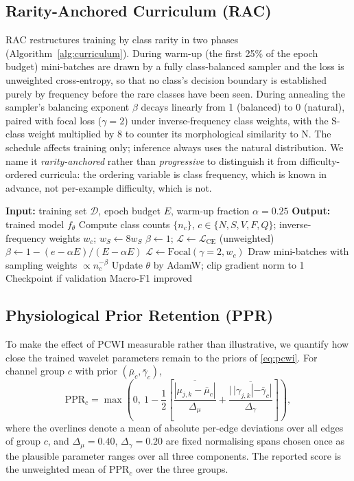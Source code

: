 \documentclass[journal,twoside,web]{ieeecolor}
\begin{document}
\subsection{Rarity-Anchored Curriculum (RAC)}
\label{sec:rac}
RAC restructures training by class rarity in two phases (Algorithm~\ref{alg:curriculum}). During warm-up (the first 25\% of the epoch budget) mini-batches are drawn by a fully class-balanced sampler and the loss is unweighted cross-entropy, so that no class's decision boundary is established purely by frequency before the rare classes have been seen. During annealing the sampler's balancing exponent $\beta$ decays linearly from 1 (balanced) to 0 (natural), paired with focal loss ($\gamma=2$) under inverse-frequency class weights, with the S-class weight multiplied by 8 to counter its morphological similarity to N. The schedule affects training only; inference always uses the natural distribution. We name it \emph{rarity-anchored} rather than \emph{progressive} to distinguish it from difficulty-ordered curricula: the ordering variable is class frequency, which is known in advance, not per-example difficulty, which is not.

\begin{algorithm}[!t]
\caption{Rarity-Anchored Curriculum (RAC)}
\label{alg:curriculum}
\begin{algorithmic}[1]
\STATE \textbf{Input:} training set $\mathcal{D}$, epoch budget $E$, warm-up fraction $\alpha=0.25$
\STATE \textbf{Output:} trained model $f_\theta$
\STATE Compute class counts $\{n_c\}$, $c\in\{N,S,V,F,Q\}$; inverse-frequency weights $w_c$; $w_S \gets 8 w_S$
\STATE $\beta \gets 1$; \quad $\mathcal{L} \gets \mathcal{L}_{\mathrm{CE}}$ (unweighted)
\ELSE
\STATE $\beta \gets 1 - (e - \alpha E)/(E - \alpha E)$
\STATE $\mathcal{L} \gets \mathrm{Focal}(\gamma{=}2, w_c)$
\ENDIF
\STATE Draw mini-batches with sampling weights $\propto n_c^{-\beta}$
\STATE Update $\theta$ by AdamW; clip gradient norm to 1
\STATE Checkpoint if validation Macro-F1 improved
\ENDFOR
\end{algorithmic}
\end{algorithm}

\subsection{Physiological Prior Retention (PPR)}
\label{sec:ppr_def}
To make the effect of PCWI measurable rather than illustrative, we quantify how close the trained wavelet parameters remain to the priors of \eqref{eq:pcwi}. For channel group $c$ with prior $(\bar\mu_c, \bar\gamma_c)$,
\begin{equation}
\mathrm{PPR}_c = \max\!\left(0,\ 1 - \frac{1}{2}\!\left[
\frac{\overline{|\mu_{j,k} - \bar\mu_c|}}{\Delta_\mu}
+ \frac{\overline{|\,|\gamma_{j,k}| - \bar\gamma_c|}}{\Delta_\gamma}
\right]\right),
\label{eq:ppr}
\end{equation}
where the overlines denote a mean of absolute per-edge deviations over all edges of group $c$, and $\Delta_\mu = 0.40$, $\Delta_\gamma = 0.20$ are fixed normalising spans chosen once as the plausible parameter ranges over all three components. The reported score is the unweighted mean of $\mathrm{PPR}_c$ over the three groups.
\end{document}
